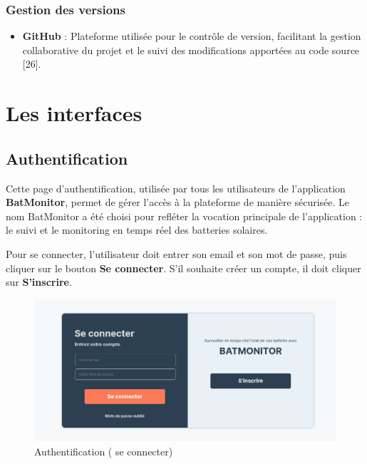 \subsubsection{Gestion des versions}
\begin{itemize}
	\item \textbf{GitHub} : Plateforme utilisée pour le contrôle de version, facilitant la gestion collaborative du projet et le suivi des modifications apportées au code source [26].
\end{itemize}

\section{Les interfaces }

\subsection{Authentification}

Cette page d’authentification, utilisée par tous les utilisateurs de l'application \textbf{BatMonitor}, permet de gérer l'accès à la plateforme de manière sécurisée. Le nom BatMonitor a été choisi pour refléter la vocation principale de l'application : le suivi et le monitoring en temps réel des batteries solaires.

Pour se connecter, l’utilisateur doit entrer son email et son mot de passe, puis cliquer sur le bouton\textbf{ Se connecter}.
S’il souhaite créer un compte, il doit cliquer sur \textbf{S'inscrire}.


\begin{figure}[H]
	\centering
	\includegraphics[width=17cm]{./img/interface/login.png}
	\caption{Authentification ( se connecter)}
	\label{fig:relais_5vdc}
\end{figure}

